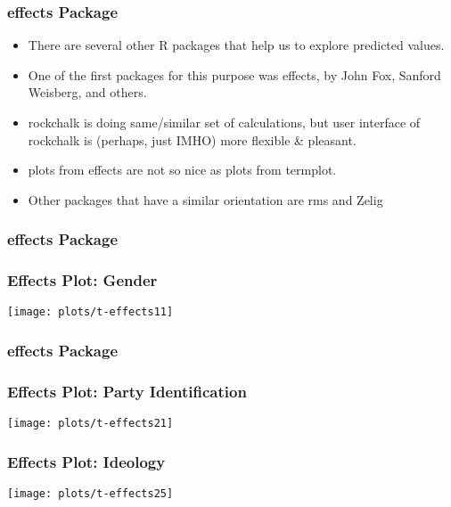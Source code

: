 \documentclass[10pt,english]{beamer}
\begin{document}
\begin{frame}[containsverbatim]
\frametitle{effects Package}
\begin{itemize}
\item There are several other R packages that help us to explore predicted
values.
\item One of the first packages for this purpose was effects, by John Fox,
Sanford Weisberg, and others.
\item rockchalk is doing same/similar set of calculations, but user interface
of rockchalk is (perhaps, just IMHO) more flexible \& pleasant.
\item plots from effects are not so nice as plots from termplot.
\item Other packages that have a similar orientation are rms and Zelig
\end{itemize}
\end{frame}

\begin{frame}[containsverbatim]
\frametitle{effects Package}





\end{frame}

\begin{frame}[containsverbatim]
\frametitle{Effects Plot: Gender}

\texttt{[image: plots/t-effects11]}

\end{frame}

\begin{frame}[containsverbatim]
\frametitle{effects Package}





\end{frame}

\begin{frame}[containsverbatim]
\frametitle{Effects Plot: Party Identification}

\texttt{[image: plots/t-effects21]}

\end{frame}

\begin{frame}[containsverbatim]
\frametitle{Effects Plot: Ideology}



\texttt{[image: plots/t-effects25]}

\end{frame}
\end{document}
